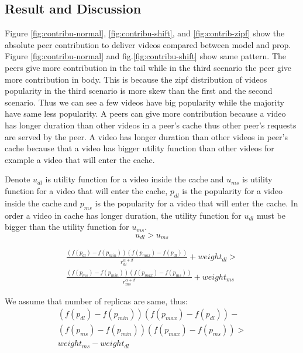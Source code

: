 \documentclass[10pt,final,journal,a4paper]{IEEEtran}
\begin{document}
\subsection{Result and Discussion}\label{resultanddiscussion}
Figure \ref{fig:contribu-normal}, \ref{fig:contribu-shift}, and \ref{fig:contrib-zipf} show the absolute peer contribution to deliver videos compared between model and prop. 
Figure \ref{fig:contribu-normal} and fig.\ref{fig:contribu-shift} show same pattern.
The peers give more contribution in the tail while in the third scenario the peer give more contribution in body. 
This is because the zipf distribution of videos popularity in the third scenario is more skew than the first and the second scenario. Thus we can see a few videos have big popularity while the majority have same less popularity. 
A peers can give more contribution because a video has longer duration than other videos in a peer's cache thus other peer's requests are served by the peer. 
A video has longer duration than other videos in peer's cache because that a video has bigger utility function than other videos for example a video that will enter the cache. 

Denote $u_{dl}$ is utility function for a video inside the cache and $u_{ms}$ is utility function for a video that will enter the cache,  $p_{dl}$ is the popularity for a video inside the cache and $p_{ms}$ is the popularity for a video that will enter the cache.
In order a video in cache has longer duration, the utility function for $u_{dl}$ must be bigger than the utility function for $u_{ms}$.
\begin{equation*}
u_{dl} > u_{ms}
\end{equation*}

\begin{align*}
\frac{ (f(p_{dl}) - f(p_{min})) (f(p_{max}) - f(p_{dl})) }{r^{\alpha + \beta}_{dl}} + weight_{dl} > \\
\frac{ (f(p_{ms}) - f(p_{min})) (f(p_{max}) - f(p_{ms})) }{r^{\alpha + \beta}_{ms}} + weight_{ms}
\end{align*}

We assume that number of replicas are same, thus:
\begin{align*}
(f(p_{dl}) - f(p_{min})) (f(p_{max}) - f(p_{dl})) - \\ 
(f(p_{ms}) - f(p_{min})) (f(p_{max}) - f(p_{ms})) > \\
weight_{ms} - weight_{dl}
\end{align*}
\end{document}
